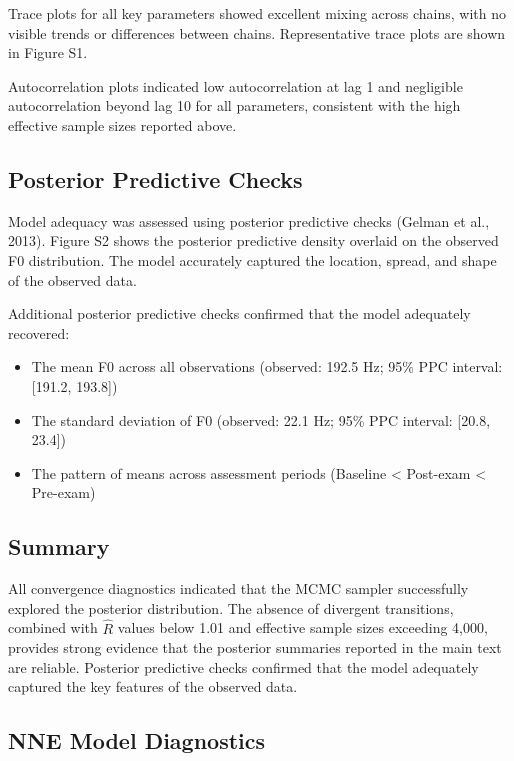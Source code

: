 \documentclass[
  english,
  man,floatsintext]{apa6}
\providecommand{\tightlist}{%
  \setlength{\itemsep}{0pt}\setlength{\parskip}{0pt}}
\begin{document}
Trace plots for all key parameters showed excellent mixing across chains, with no visible trends or differences between chains. Representative trace plots are shown in Figure S1.

Autocorrelation plots indicated low autocorrelation at lag 1 and negligible autocorrelation beyond lag 10 for all parameters, consistent with the high effective sample sizes reported above.

\subsection{Posterior Predictive Checks}\label{posterior-predictive-checks-1}

Model adequacy was assessed using posterior predictive checks (Gelman et al., 2013). Figure S2 shows the posterior predictive density overlaid on the observed F0 distribution. The model accurately captured the location, spread, and shape of the observed data.

Additional posterior predictive checks confirmed that the model adequately recovered:

\begin{itemize}
\tightlist
\item
  The mean F0 across all observations (observed: 192.5 Hz; 95\% PPC interval: {[}191.2, 193.8{]})
\item
  The standard deviation of F0 (observed: 22.1 Hz; 95\% PPC interval: {[}20.8, 23.4{]})
\item
  The pattern of means across assessment periods (Baseline \textless{} Post-exam \textless{} Pre-exam)
\end{itemize}

\subsection{Summary}\label{summary-1}

All convergence diagnostics indicated that the MCMC sampler successfully explored the posterior distribution. The absence of divergent transitions, combined with \(\hat{R}\) values below 1.01 and effective sample sizes exceeding 4,000, provides strong evidence that the posterior summaries reported in the main text are reliable. Posterior predictive checks confirmed that the model adequately captured the key features of the observed data.

\subsection{NNE Model Diagnostics}\label{nne-model-diagnostics}
\end{document}
